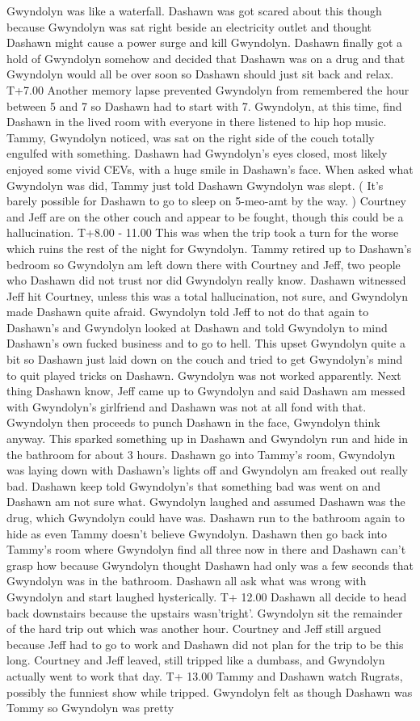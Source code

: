 \documentclass[12pt]{book}
\begin{document}
Gwyndolyn was like a waterfall. Dashawn was got scared about this though because Gwyndolyn was sat right beside an electricity outlet and thought Dashawn might cause a power surge and kill Gwyndolyn. Dashawn finally got a hold of Gwyndolyn somehow and decided that Dashawn was on a drug and that Gwyndolyn would all be over soon so Dashawn should just sit back and relax. T+7.00 Another memory lapse prevented Gwyndolyn from remembered the hour between 5 and 7 so Dashawn had to start with 7. Gwyndolyn, at this time, find Dashawn in the lived room with everyone in there listened to hip hop music. Tammy, Gwyndolyn noticed, was sat on the right side of the couch totally engulfed with something. Dashawn had Gwyndolyn's eyes closed, most likely enjoyed some vivid CEVs, with a huge smile in Dashawn's face. When asked what Gwyndolyn was did, Tammy just told Dashawn Gwyndolyn was slept. ( It's barely possible for Dashawn to go to sleep on 5-meo-amt by the way. ) Courtney and Jeff are on the other couch and appear to be fought, though this could be a hallucination. T+8.00 - 11.00 This was when the trip took a turn for the worse which ruins the rest of the night for Gwyndolyn. Tammy retired up to Dashawn's bedroom so Gwyndolyn am left down there with Courtney and Jeff, two people who Dashawn did not trust nor did Gwyndolyn really know. Dashawn witnessed Jeff hit Courtney, unless this was a total hallucination, not sure, and Gwyndolyn made Dashawn quite afraid. Gwyndolyn told Jeff to not do that again to Dashawn's and Gwyndolyn looked at Dashawn and told Gwyndolyn to mind Dashawn's own fucked business and to go to hell. This upset Gwyndolyn quite a bit so Dashawn just laid down on the couch and tried to get Gwyndolyn's mind to quit played tricks on Dashawn. Gwyndolyn was not worked apparently. Next thing Dashawn know, Jeff came up to Gwyndolyn and said Dashawn am messed with Gwyndolyn's girlfriend and Dashawn was not at all fond with that. Gwyndolyn then proceeds to punch Dashawn in the face, Gwyndolyn think anyway. This sparked something up in Dashawn and Gwyndolyn run and hide in the bathroom for about 3 hours. Dashawn go into Tammy's room, Gwyndolyn was laying down with Dashawn's lights off and Gwyndolyn am freaked out really bad. Dashawn keep told Gwyndolyn's that something bad was went on and Dashawn am not sure what. Gwyndolyn laughed and assumed Dashawn was the drug, which Gwyndolyn could have was. Dashawn run to the bathroom again to hide as even Tammy doesn't believe Gwyndolyn. Dashawn then go back into Tammy's room where Gwyndolyn find all three now in there and Dashawn can't grasp how because Gwyndolyn thought Dashawn had only was a few seconds that Gwyndolyn was in the bathroom. Dashawn all ask what was wrong with Gwyndolyn and start laughed hysterically. T+ 12.00 Dashawn all decide to head back downstairs because the upstairs wasn'tright'. Gwyndolyn sit the remainder of the hard trip out which was another hour. Courtney and Jeff still argued because Jeff had to go to work and Dashawn did not plan for the trip to be this long. Courtney and Jeff leaved, still tripped like a dumbass, and Gwyndolyn actually went to work that day. T+ 13.00 Tammy and Dashawn watch Rugrats, possibly the funniest show while tripped. Gwyndolyn felt as though Dashawn was Tommy so Gwyndolyn was pretty 
\end{document}
